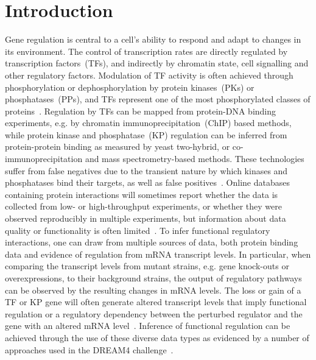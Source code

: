 \documentclass[10pt,letterpaper]{article}
\begin{document}
\section*{Introduction}
Gene regulation is central to a cell's ability to respond and adapt to changes in its environment.
The control of transcription rates are directly regulated by transcription factors~(TFs), and indirectly by chromatin state, cell signalling and other regulatory factors.
Modulation of TF activity is often achieved through phosphorylation or dephosphorylation by protein kinases~(PKs) or phosphatases~(PPs), and TFs represent one of the most phosphorylated classes of proteins~.
Regulation by TFs can be mapped from protein-DNA binding experiments, e.g. by chromatin immunoprecipitation~(ChIP) based methods, while protein kinase and phosphatase~(KP) regulation can be inferred from protein-protein binding as measured by yeast two-hybrid, or co-immunoprecipitation and mass spectrometry-based methods. These technologies suffer from false negatives due to the transient nature by which kinases and phosphatases bind their targets, as well as false positives~. Online databases containing protein interactions will sometimes report whether the data is collected from low- or high-throughput experiments, or whether they were observed reproducibly in multiple experiments, but information about data quality or functionality is often limited~. 
To infer functional regulatory interactions, one can draw from multiple sources of data, both protein binding data and evidence of regulation from mRNA transcript levels. In particular, when comparing the transcript levels from mutant strains, e.g. gene knock-outs or overexpressions, to their background strains, the output of regulatory pathways can be observed by the resulting changes in mRNA levels. The loss or gain of a TF or KP gene will often generate altered transcript levels that imply functional regulation or a regulatory dependency between the perturbed regulator and the gene with an altered mRNA level~. Inference of functional regulation can be achieved through the use of these diverse data types as evidenced by a number of approaches used in the DREAM4 challenge~.
\end{document}

